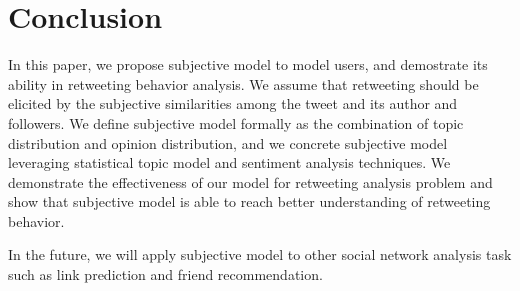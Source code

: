 \documentclass[letterpaper]{article}
\begin{document}
\section{Conclusion}
In this paper, we propose subjective model to model users, and demostrate its ability in retweeting behavior analysis. We assume that retweeting should be elicited by the subjective similarities among the tweet and its author and followers. 
We define subjective model formally as the combination of topic distribution and opinion distribution, and we concrete subjective model leveraging statistical topic model and sentiment analysis techniques.
We demonstrate the effectiveness of our model for retweeting analysis problem and show that subjective model is able to reach better understanding of retweeting behavior. 

In the future, we will apply subjective model to other social network analysis task such as link prediction and friend recommendation. 



\end{document}
